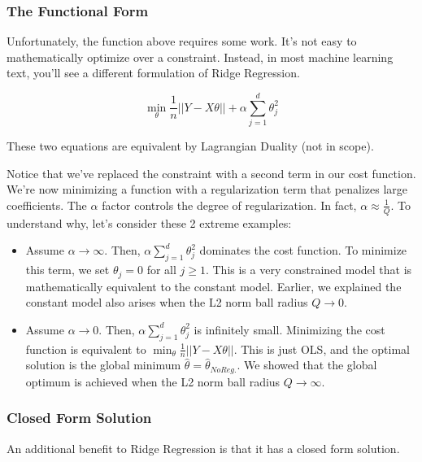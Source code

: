 \documentclass[
  letterpaper,
  DIV=11,
  numbers=noendperiod]{scrreprt}
\begin{document}
\hypertarget{the-functional-form}{%
\subsubsection{The Functional Form}\label{the-functional-form}}

Unfortunately, the function above requires some work. It's not easy to
mathematically optimize over a constraint. Instead, in most machine
learning text, you'll see a different formulation of Ridge Regression.

\[\min_{\theta} \frac{1}{n} || Y - X\theta || + \alpha \sum_{j=1}^{d} \theta_j^{2}\]

These two equations are equivalent by Lagrangian Duality (not in scope).

Notice that we've replaced the constraint with a second term in our cost
function. We're now minimizing a function with a regularization term
that penalizes large coefficients. The \(\alpha\) factor controls the
degree of regularization. In fact, \(\alpha \approx \frac{1}{Q}\). To
understand why, let's consider these 2 extreme examples:

\begin{itemize}
\item
  Assume \(\alpha \rightarrow \infty\). Then,
  \(\alpha \sum_{j=1}^{d} \theta_j^{2}\) dominates the cost function. To
  minimize this term, we set \(\theta_j = 0\) for all \(j \ge 1\). This
  is a very constrained model that is mathematically equivalent to the
  constant model. Earlier, we explained the constant model also arises
  when the L2 norm ball radius \(Q \rightarrow 0\).
\item
  Assume \(\alpha \rightarrow 0\). Then,
  \(\alpha \sum_{j=1}^{d} \theta_j^{2}\) is infinitely small. Minimizing
  the cost function is equivalent to
  \(\min_{\theta} \frac{1}{n} || Y - X\theta ||\). This is just OLS, and
  the optimal solution is the global minimum
  \(\hat{\theta} = \hat\theta_{No Reg.}\). We showed that the global
  optimum is achieved when the L2 norm ball radius
  \(Q \rightarrow \infty\).
\end{itemize}

\hypertarget{closed-form-solution}{%
\subsubsection{Closed Form Solution}\label{closed-form-solution}}

An additional benefit to Ridge Regression is that it has a closed form
solution.
\end{document}
